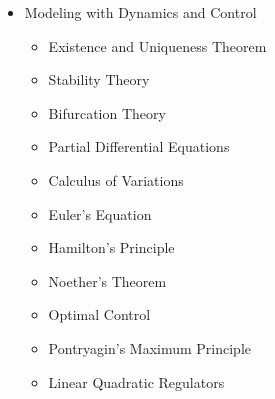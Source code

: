 \documentclass{article}
\begin{document}
\begin{addmargin}{2ex}
\begin{itemize}[labelindent=2ex, parsep=0ex, partopsep=0ex, topsep=-.7ex]
\begin{multicols}{2}
\begin{itemize}
          \item Bayesian Analysis
          \item Estimation in State Space Models
          \item Machine Learning
          \item Unsupervised Methods
          \item Graphical and Latent Variable Models
          \item Kernel Methods
          \item Tree-Based Methods
        \end{itemize}
      \end{multicols}
    \item Modeling with Dynamics and Control
      \begin{multicols}{2}
        \begin{itemize}
          \item Existence and Uniqueness Theorem
          \item Stability Theory
          \item Bifurcation Theory
          \item Partial Differential Equations
          \item Calculus of Variations
          \item Euler's Equation
          \item Hamilton's Principle
          \item Noether's Theorem
          \item Optimal Control
          \item Pontryagin's Maximum Principle
          \item Linear Quadratic Regulators
        \end{itemize}
      \end{multicols}
  \end{itemize}
\end{addmargin}
\end{document}

